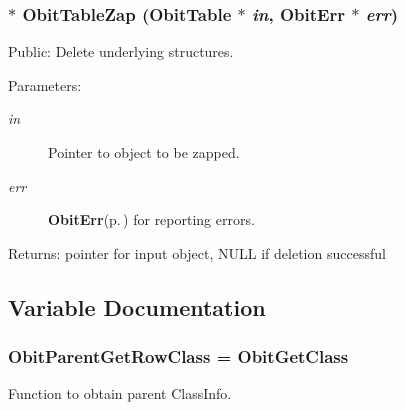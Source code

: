 \subsubsection{$\ast$ Obit\-Table\-Zap ({\bf Obit\-Table} $\ast$ {\em in}, {\bf Obit\-Err} $\ast$ {\em err})}\label{ObitTable_8c_a18}


Public: Delete underlying structures. 

\begin{Desc}
\item[Parameters:]
\begin{description}
\item[{\em in}]Pointer to object to be zapped. \item[{\em err}]{\bf Obit\-Err}{\rm (p.\,\pageref{structObitErr})} for reporting errors. \end{description}
\end{Desc}
\begin{Desc}
\item[Returns:]pointer for input object, NULL if deletion successful \end{Desc}


\subsection{Variable Documentation}
\subsubsection{ {\bf Obit\-Parent\-Get\-Row\-Class} = Obit\-Get\-Class}\label{ObitTable_8c_a3}


Function to obtain parent Class\-Info. 

